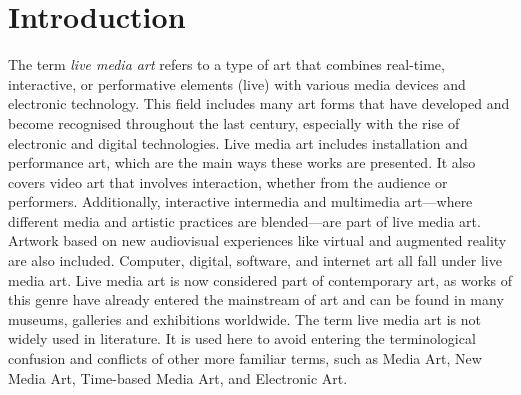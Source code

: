 
\chapter*{\label{ch:introduction}Introduction}

The term \textit{live media art} refers to a type of art that combines real-time, interactive, or performative elements (live) with various media devices and electronic technology. This field includes many art forms that have developed and become recognised throughout the last century, especially with the rise of electronic and digital technologies. Live media art includes installation and performance art, which are the main ways these works are presented. It also covers video art that involves interaction, whether from the audience or performers. Additionally, interactive intermedia and multimedia art—where different media and artistic practices are blended—are part of live media art. Artwork based on new audiovisual experiences like virtual and augmented reality are also included. Computer, digital, software, and internet art all fall under live media art. Live media art is now considered part of contemporary art, as works of this genre have already entered the mainstream of art and can be found in many museums, galleries and exhibitions worldwide. The term live media art is not widely used in literature. It is used here to avoid entering the terminological confusion and conflicts of other more familiar terms, such as Media Art, New Media Art, Time-based Media Art, and Electronic Art.\\
